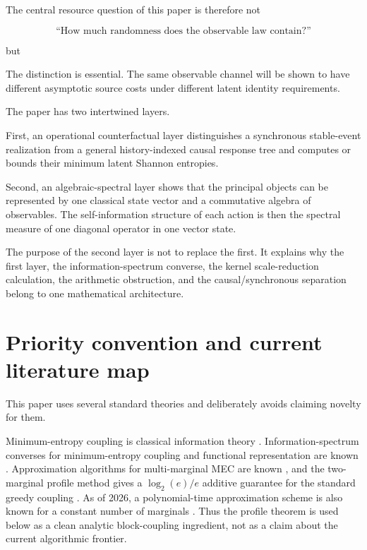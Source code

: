 \documentclass[11pt,a4paper]{article}
\newcommand{\1}{\mathbf 1}
\begin{document}
The central resource question of this paper is therefore not

\[
\text{``How much randomness does the observable law contain?''}
\]

but

\begin{center}
\end{center}

The distinction is essential.
The same observable channel will be shown to have different asymptotic
source costs under different latent identity requirements.

The paper has two intertwined layers.

First, an operational counterfactual layer distinguishes a synchronous
stable-event realization from a general history-indexed causal response
tree and computes or bounds their minimum latent Shannon entropies.

Second, an algebraic-spectral layer shows that the principal objects can
be represented by one classical state vector and a commutative algebra
of observables.
The self-information structure of each action is then the spectral
measure of one diagonal operator in one vector state.

The purpose of the second layer is not to replace the first.
It explains why the first layer, the information-spectrum converse, the
kernel scale-reduction calculation, the arithmetic obstruction, and the
causal/synchronous separation belong to one mathematical architecture.


\section{Priority convention and current literature map}

This paper uses several standard theories and deliberately avoids
claiming novelty for them.

Minimum-entropy coupling is classical information theory
\cite{Kovacevic2015}.
Information-spectrum converses for minimum-entropy coupling and
functional representation are known \cite{ShkelYadav2023}.
Approximation algorithms for multi-marginal MEC are known
\cite{Li2021}, and the two-marginal profile method gives a
\(\log_2(e)/e\) additive guarantee for the standard greedy coupling
\cite{Compton2023}.
As of 2026, a polynomial-time approximation scheme is also known for a
constant number of marginals \cite{Compton2026PTAS}.
Thus the profile theorem is used below as a clean analytic block-coupling
ingredient, not as a claim about the current algorithmic frontier.
\end{document}

